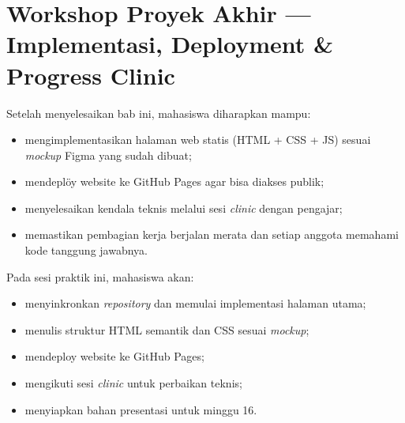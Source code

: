 
\chapter{Workshop Proyek Akhir --- Implementasi, Deployment \& Progress Clinic}
\label{chap:minggu-15}

\begin{capaian}
Setelah menyelesaikan bab ini, mahasiswa diharapkan mampu:
\begin{itemize}
  \item mengimplementasikan halaman web statis (HTML + CSS + JS) sesuai \emph{mockup} Figma yang sudah dibuat;
  \item mendeplöy website ke GitHub Pages agar bisa diakses publik;
  \item menyelesaikan kendala teknis melalui sesi \emph{clinic} dengan pengajar;
  \item memastikan pembagian kerja berjalan merata dan setiap anggota memahami kode tanggung jawabnya.
\end{itemize}
\end{capaian}

\begin{tujuanpraktik}
Pada sesi praktik ini, mahasiswa akan:
\begin{itemize}
  \item menyinkronkan \emph{repository} dan memulai implementasi halaman utama;
  \item menulis struktur HTML semantik dan CSS sesuai \emph{mockup};
  \item mendeploy website ke GitHub Pages;
  \item mengikuti sesi \emph{clinic} untuk perbaikan teknis;
  \item menyiapkan bahan presentasi untuk minggu 16.
\end{itemize}
\end{tujuanpraktik}

